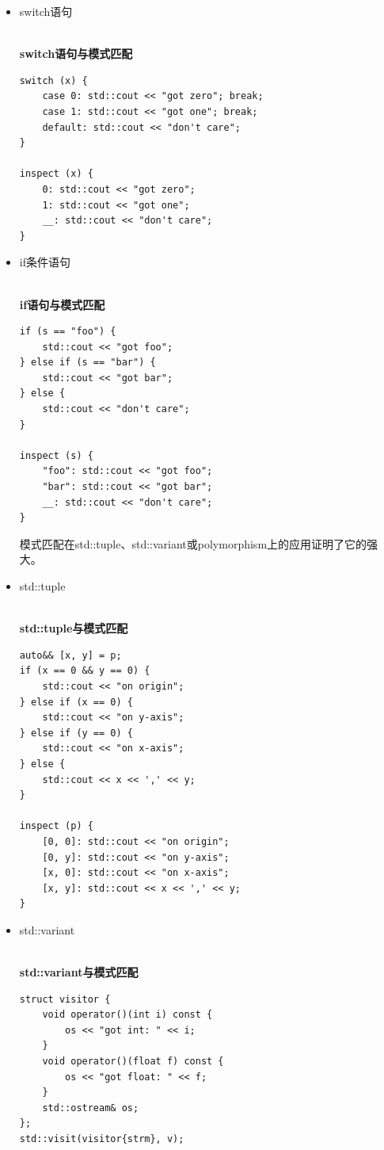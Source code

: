\begin{itemize}
\item 
switch语句

\hspace*{\fill} \\ %
\noindent
\textbf{switch语句与模式匹配}
\begin{lstlisting}[style=styleCXX]
switch (x) {
	case 0: std::cout << "got zero"; break;
	case 1: std::cout << "got one"; break;
	default: std::cout << "don't care";
}

inspect (x) {
	0: std::cout << "got zero";
	1: std::cout << "got one";
	__: std::cout << "don't care";
}
\end{lstlisting}

\item 
if条件语句

\hspace*{\fill} \\ %
\noindent
\textbf{if语句与模式匹配}
\begin{lstlisting}[style=styleCXX]
if (s == "foo") {
	std::cout << "got foo";
} else if (s == "bar") {
	std::cout << "got bar";
} else {
	std::cout << "don't care";
}

inspect (s) {
	"foo": std::cout << "got foo";
	"bar": std::cout << "got bar";
	__: std::cout << "don't care";
}
\end{lstlisting}

模式匹配在std::tuple、std::variant或polymorphism上的应用证明了它的强大。

\item 
std::tuple

\hspace*{\fill} \\ %
\noindent
\textbf{std::tuple与模式匹配}
\begin{lstlisting}[style=styleCXX]
auto&& [x, y] = p;
if (x == 0 && y == 0) {
	std::cout << "on origin";
} else if (x == 0) {
	std::cout << "on y-axis";
} else if (y == 0) {
	std::cout << "on x-axis";
} else {
	std::cout << x << ',' << y;
}

inspect (p) {
	[0, 0]: std::cout << "on origin";
	[0, y]: std::cout << "on y-axis";
	[x, 0]: std::cout << "on x-axis";
	[x, y]: std::cout << x << ',' << y;
}
\end{lstlisting}

\item 
std::variant

\hspace*{\fill} \\ %
\noindent
\textbf{std::variant与模式匹配}
\begin{lstlisting}[style=styleCXX]
struct visitor {
	void operator()(int i) const {
		os << "got int: " << i;
	}
	void operator()(float f) const {
		os << "got float: " << f;
	}
	std::ostream& os;
};
std::visit(visitor{strm}, v);


\end{lstlisting}
\end{itemize}
